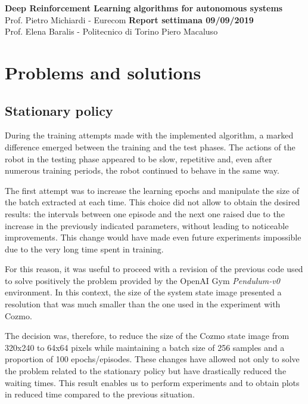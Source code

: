 \documentclass[a4paper, 11pt]{article}
\begin{document}
	\noindent
	\large\textbf{Deep Reinforcement Learning algorithms for autonomous systems}  \\
	\normalsize Prof. Pietro Michiardi - Eurecom \hfill \textbf{Report settimana 09/09/2019}\\
	\normalsize Prof. Elena Baralis - Politecnico di Torino  \hfill Piero Macaluso
	
		\tableofcontents
	\section{Problems and solutions}
	
	\subsection{Stationary policy}
	
	During the training attempts made with the implemented algorithm, a marked difference emerged between the training and the test phases. The actions of the robot in the testing phase appeared to be slow, repetitive and, even after numerous training periods, the robot continued to behave in the same way.
	
	The first attempt was to increase the learning epochs and manipulate the size of the batch extracted at each time. This choice did not allow to obtain the desired results: the intervals between one episode and the next one raised due to the increase in the previously indicated parameters, without leading to noticeable improvements. This change would have made even future experiments impossible due to the very long time spent in training.
	
	For this reason, it was useful to proceed with a revision of the previous code used to solve positively the problem provided by the OpenAI Gym \textit{Pendulum-v0} environment. In this context, the size of the system state image presented a resolution that was much smaller than the one used in the experiment with Cozmo.
	
	The decision was, therefore, to reduce the size of the Cozmo state image from 320x240 to 64x64 pixels while maintaining a batch size of 256 samples and a proportion of 100 epochs/episodes. These changes have allowed not only to solve the problem related to the stationary policy but have drastically reduced the waiting times. This result enables us to perform experiments and to obtain plots in reduced time compared to the previous situation.
	
\end{document}
